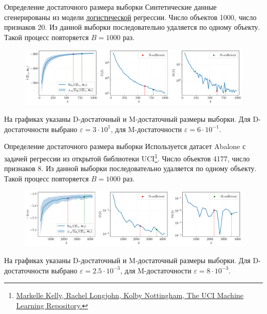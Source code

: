 \documentclass[10pt]{beamer}
\begin{document}
\begin{frame}{Определение достаточного размера выборки}
    Синтетические данные сгенерированы из модели \underline{логистической} регрессии. Число объектов 1000, число признаков 20. Из данной выборки последовательно удаляется по одному объекту. Такой процесс повторяется $B=1000$ раз.
    \vfill
    \begin{figure}[h!]
        \centering
        \includegraphics[width=\textwidth]{paper/figures/synthetic-classification-sufficient.pdf}
    \end{figure}
    \vfill
    На графиках указаны D-достаточный и M-достаточный размеры выборки. Для D-достаточности выбрано $\varepsilon = 3 \cdot 10^{1}$, для M-достаточности $\varepsilon = 6 \cdot 10^{-1}$.
\end{frame}
\begin{frame}{Определение достаточного размера выборки}
    Используется датасет Abalone с задачей регрессии из открытой библиотеки UCI\footnote{\href{https://archive.ics.uci.edu}{Markelle Kelly, Rachel Longjohn, Kolby Nottingham, The UCI Machine Learning Repository.}}. Число объектов 4177, число признаков 8. Из данной выборки последовательно удаляется по одному объекту. Такой процесс повторяется $B=1000$ раз.
    \vfill
    \begin{figure}[h!]
        \centering
        \includegraphics[width=\textwidth]{paper/figures/abalone-sufficient.pdf}
    \end{figure}
    \vfill
    На графиках указаны D-достаточный и M-достаточный размеры выборки. Для D-достаточности выбрано $\varepsilon = 2.5 \cdot 10^{-3}$, для M-достаточности $\varepsilon = 8 \cdot 10^{-3}$.
\end{frame}
\end{document}
